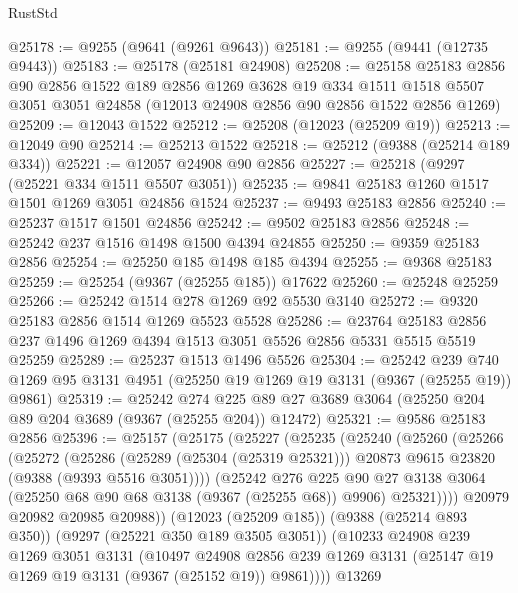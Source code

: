 \begin{lexlean}{RustStd}
\begin{coremodule}
@25178 := @9255 (@9641 (@9261 @9643))
@25181 := @9255 (@9441 (@12735 @9443))
@25183 := @25178 (@25181 @24908)
@25208 := @25158
    @25183
    @2856
    @90
    @2856
    @1522
    @189
    @2856
    @1269
    @3628
    @19
    @334
    @1511
    @1518
    @5507
    @3051
    @3051
    @24858
    (@12013 @24908 @2856 @90 @2856 @1522 @2856 @1269)
@25209 := @12043 @1522
@25212 := @25208 (@12023 (@25209 @19))
@25213 := @12049 @90
@25214 := @25213 @1522
@25218 := @25212 (@9388 (@25214 @189 @334))
@25221 := @12057 @24908 @90 @2856
@25227 := @25218 (@9297 (@25221 @334 @1511 @5507 @3051))
@25235 := @9841 @25183 @1260 @1517 @1501 @1269 @3051 @24856 @1524
@25237 := @9493 @25183 @2856
@25240 := @25237 @1517 @1501 @24856
@25242 := @9502 @25183 @2856
@25248 := @25242 @237 @1516 @1498 @1500 @4394 @24855
@25250 := @9359 @25183 @2856
@25254 := @25250 @185 @1498 @185 @4394
@25255 := @9368 @25183
@25259 := @25254 (@9367 (@25255 @185)) @17622
@25260 := @25248 @25259
@25266 := @25242 @1514 @278 @1269 @92 @5530 @3140
@25272 := @9320 @25183 @2856 @1514 @1269 @5523 @5528
@25286 := @23764
    @25183
    @2856
    @237
    @1496
    @1269
    @4394
    @1513
    @3051
    @5526
    @2856
    @5331
    @5515
    @5519
    @25259
@25289 := @25237 @1513 @1496 @5526
@25304 := @25242
    @239
    @740
    @1269
    @95
    @3131
    @4951
    (@25250 @19 @1269 @19 @3131 (@9367 (@25255 @19)) @9861)
@25319 := @25242
    @274
    @225
    @89
    @27
    @3689
    @3064
    (@25250 @204 @89 @204 @3689 (@9367 (@25255 @204)) @12472)
@25321 := @9586 @25183 @2856
@25396 := @25157
    (@25175
      (@25227
        (@25235
          (@25240
            (@25260
              (@25266
                (@25272
                  (@25286
                    (@25289 (@25304 (@25319 @25321)))
                    @20873
                    @9615
                    @23820
                    (@9388 (@9393 @5516 @3051))))
                (@25242
                  @276
                  @225
                  @90
                  @27
                  @3138
                  @3064
                  (@25250 @68 @90 @68 @3138 (@9367 (@25255 @68)) @9906)
                  @25321))))
          @20979
          @20982
          @20985
          @20988))
      (@12023 (@25209 @185))
      (@9388 (@25214 @893 @350))
      (@9297 (@25221 @350 @189 @3505 @3051))
      (@10233
        @24908
        @239
        @1269
        @3051
        @3131
        (@10497
          @24908
          @2856
          @239
          @1269
          @3131
          (@25147 @19 @1269 @19 @3131 (@9367 (@25152 @19)) @9861))))
    @13269

\end{coremodule}
\end{lexlean}
